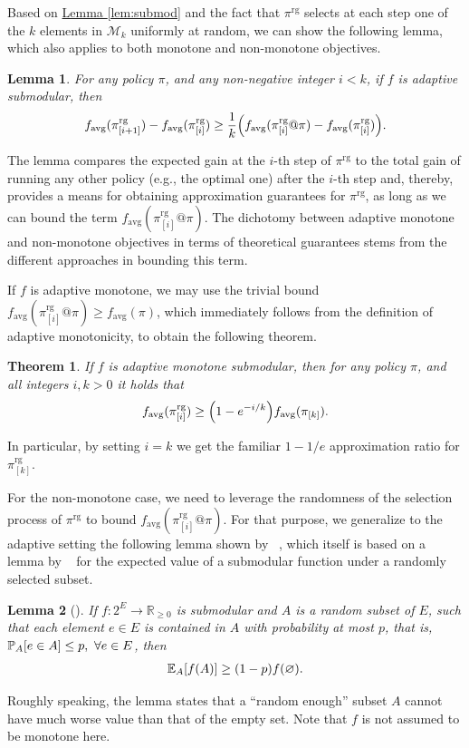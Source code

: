 \documentclass{article}
\newcommand{\lemmaref}[1]{\hyperref[#1]{Lemma \ref*{#1}}}
\newtheorem{theorem}{Theorem}
\newtheorem{lemma}{Lemma}
\let\originalleft\left
\let\originalright\right
\renewcommand{\left}{\mathopen{}\mathclose\bgroup\originalleft}
\renewcommand{\right}{\aftergroup\egroup\originalright}
\newcommand{\pik}{\pi_{[k]}}
\newcommand{\pig}{\pi^{\textrm{rg}}}
\newcommand{\pigi}{\pi^{\textrm{rg}}_{[i]}}
\newcommand{\pigii}{\pi^{\textrm{rg}}_{[i+1]}}
\newcommand{\pigk}{\pi^{\textrm{rg}}_{[k]}}
\newcommand{\favg}{f_{\mathrm{avg}}}
\newcommand{\Mk}{\mathcal{M}_k}
\newcommand{\citet}[1]{\citeauthor{#1}~\shortcite{#1}}
\begin{document}
Based on \lemmaref{lem:submod} and the fact that $\pig$ selects at each step one of the $k$ elements in $\Mk$ uniformly at random, we can show the following lemma, which also applies to both monotone and non-monotone objectives.
\begin{lemma}\label{lem:mon_main}
  For any policy $\pi$, and any non-negative integer $i < k$, if $f$ is adaptive submodular, then
  \begin{align*}
    \favg(\pigii) - \favg(\pigi) \geq \frac{1}{k}\left(\favg(\pigi @ \pi) - \favg(\pigi)\right).
  \end{align*}
\end{lemma}
\noindent The lemma compares the expected gain at the $i$-th step of $\pig$ to the total gain of running any other policy (e.g., the optimal one) after the $i$-th step and, thereby, provides a means for obtaining approximation guarantees for $\pig$, as long as we can bound the term $\favg(\pigi @ \pi)$.
The dichotomy between adaptive monotone and non-monotone objectives in terms of theoretical guarantees stems from the different approaches in bounding this term.

If $f$ is adaptive monotone, we may use the trivial bound $\favg(\pigi @ \pi) \geq \favg(\pi)$, which immediately follows from the definition of adaptive monotonicity, to obtain the following theorem.
\begin{theorem}
  If $f$ is adaptive monotone submodular, then for any policy $\pi$, and all integers $i, k > 0$ it holds that
  \begin{align*}
    \favg(\pigi) \geq \left(1 - e^{-i/k}\right)\favg(\pik).
  \end{align*}
\end{theorem}
\noindent In particular, by setting $i = k$ we get the familiar $1-1/e$ approximation ratio for $\pigk$.

For the non-monotone case, we need to leverage the randomness of the selection process of $\pig$ to bound $\favg(\pigi @ \pi)$.
For that purpose, we generalize to the adaptive setting the following lemma shown by \citet{buchbinder14}, which itself is based on a lemma by \citet{feige07} for the expected value of a submodular function under a randomly selected subset.
\begin{lemma}[\cite{buchbinder14}]
  If $f : 2^E \to \mathbb{R}_{\geq 0}$ is submodular and $A$ is a random subset of $E$, such that each element $e \in E$ is contained in $A$ with probability at most $p$, that is, $\P[A]{e \in A} \leq p,\ \forall e \in E$, then
  \begin{align*}
    \E[A]{f(A)} \geq (1-p)f(\varnothing).
  \end{align*}
\end{lemma}
\noindent Roughly speaking, the lemma states that a ``random enough'' subset $A$ cannot have much worse value than that of the empty set.
Note that $f$ is not assumed to be monotone here.
\end{document}
